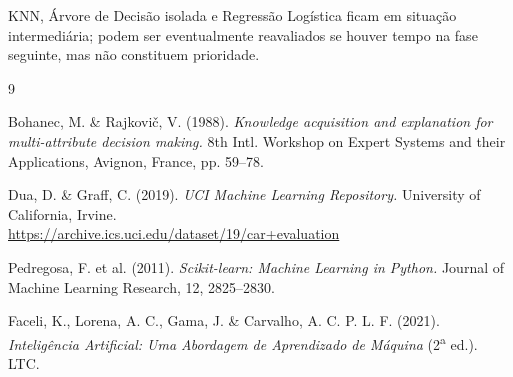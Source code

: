 \documentclass[11pt,a4paper]{article}
\begin{document}
KNN, Árvore de Decisão isolada e Regressão Logística ficam em situação intermediária; podem ser eventualmente reavaliados se houver tempo na fase seguinte, mas não constituem prioridade.

\begin{thebibliography}{9}

Bohanec, M. \& Rajkovi\v{c}, V. (1988).
\textit{Knowledge acquisition and explanation for multi-attribute decision making.}
8th Intl. Workshop on Expert Systems and their Applications, Avignon, France, pp. 59--78.

Dua, D. \& Graff, C. (2019).
\textit{UCI Machine Learning Repository.} University of California, Irvine.\\
\url{https://archive.ics.uci.edu/dataset/19/car+evaluation}

Pedregosa, F. et al. (2011).
\textit{Scikit-learn: Machine Learning in Python.}
Journal of Machine Learning Research, 12, 2825--2830.

Faceli, K., Lorena, A. C., Gama, J. \& Carvalho, A. C. P. L. F. (2021).
\textit{Inteligência Artificial: Uma Abordagem de Aprendizado de Máquina} (2\textsuperscript{a} ed.).
LTC.

\end{thebibliography}
\end{document}
